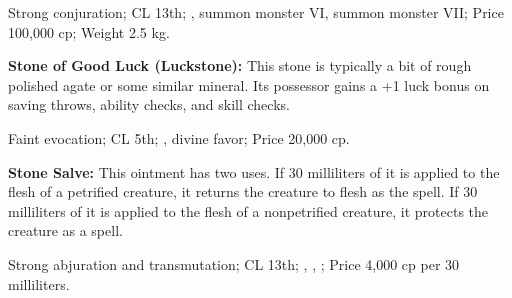 Strong conjuration; CL 13th; , summon monster VI, summon monster VII; Price 100,000 cp; Weight 2.5 kg.



\textbf{Stone of Good Luck (Luckstone):} This stone is typically a bit of rough polished agate or some similar mineral. Its possessor gains a +1 luck bonus on saving throws, ability checks, and skill checks.

Faint evocation; CL 5th; , divine favor; Price 20,000 cp.










\textbf{Stone Salve:} This ointment has two uses. If 30 milliliters of it is applied to the flesh of a petrified creature, it returns the creature to flesh as the  spell. If 30 milliliters of it is applied to the flesh of a nonpetrified creature, it protects the creature as a  spell.

Strong abjuration and transmutation; CL 13th; , , ; Price 4,000 cp per 30 milliliters.



